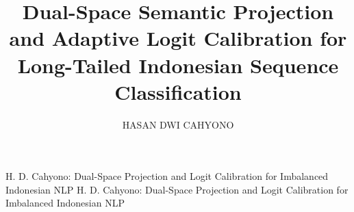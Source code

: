 \documentclass{ieeeaccess}
\begin{document}

\title{Dual-Space Semantic Projection and Adaptive Logit Calibration for Long-Tailed Indonesian Sequence Classification}

\author{\uppercase{Hasan Dwi Cahyono}}
\address{Department of Informatics, Faculty of Information Technology and Data Science,\\ Universitas Sebelas Maret, Surakarta 57126, Indonesia\\ (e-mail: hasan.dwi.cahyono@gmail.com)}

\markboth
{H. D. Cahyono: Dual-Space Projection and Logit Calibration for Imbalanced Indonesian NLP}
{H. D. Cahyono: Dual-Space Projection and Logit Calibration for Imbalanced Indonesian NLP}

\end{document}
